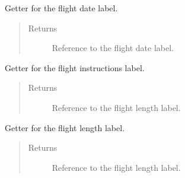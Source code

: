 \documentclass[letterpaper,10pt,english]{sphinxmanual}
\begin{document}
\begin{fulllineitems}
\begin{fulllineitems}
\begin{quote}
\begin{description}
\end{description}\end{quote}

\end{fulllineitems}


\begin{fulllineitems}
\label{\detokenize{index:src.Views.View_ReportScreen.ReportWindow.del_LblFlightDate}}
Getter for the flight date label.
\begin{quote}\begin{description}
\item[{Returns}] \leavevmode
Reference to the flight date label.

\end{description}\end{quote}

\end{fulllineitems}


\begin{fulllineitems}
\label{\detokenize{index:src.Views.View_ReportScreen.ReportWindow.del_LblFlightInstructions}}
Getter for the flight instructions label.
\begin{quote}\begin{description}
\item[{Returns}] \leavevmode
Reference to the flight length label.

\end{description}\end{quote}

\end{fulllineitems}


\begin{fulllineitems}
\label{\detokenize{index:src.Views.View_ReportScreen.ReportWindow.del_LblFlightLength}}
Getter for the flight length label.
\begin{quote}\begin{description}
\item[{Returns}] \leavevmode
Reference to the flight length label.


\end{description}
\end{quote}
\end{fulllineitems}
\end{fulllineitems}
\end{document}
